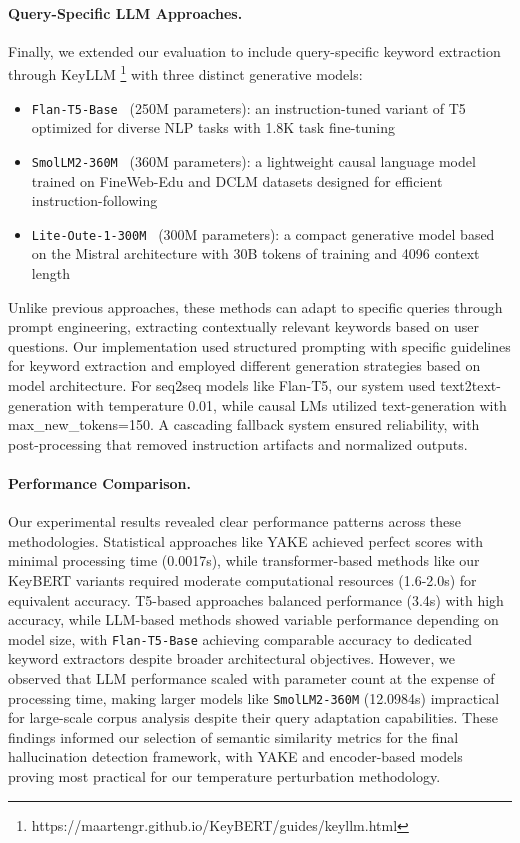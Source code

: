 \documentclass[sigconf]{acmart}
\begin{document}
\paragraph{Query-Specific LLM Approaches.}
Finally, we extended our evaluation to include query-specific keyword extraction through KeyLLM \footnote{https://maartengr.github.io/KeyBERT/guides/keyllm.html} with three distinct generative models:
\begin{itemize}
    \item \texttt{Flan-T5-Base \cite{DBLP:journals/corr/abs-2210-11416}} (250M parameters): an instruction-tuned variant of T5 optimized for diverse NLP tasks with 1.8K task fine-tuning
    \item \texttt{SmolLM2-360M \cite{DBLP:journals/corr/abs-2502-02737}} (360M parameters): a lightweight causal language model trained on FineWeb-Edu and DCLM datasets designed for efficient instruction-following
    \item \texttt{Lite-Oute-1-300M \cite{OuteAI_Lite_Oute_1_300M_2024}} (300M parameters): a compact generative model based on the Mistral architecture with 30B tokens of training and 4096 context length
\end{itemize}

Unlike previous approaches, these methods can adapt to specific queries through prompt engineering, extracting contextually relevant keywords based on user questions. Our implementation used structured prompting with specific guidelines for keyword extraction and employed different generation strategies based on model architecture. For seq2seq models like Flan-T5, our system used text2text-generation with temperature 0.01, while causal LMs utilized text-generation with max\_new\_tokens=150. A cascading fallback system ensured reliability, with post-processing that removed instruction artifacts and normalized outputs.

\paragraph{Performance Comparison.}
Our experimental results revealed clear performance patterns across these methodologies. Statistical approaches like YAKE achieved perfect scores with minimal processing time (0.0017s), while transformer-based methods like our KeyBERT variants required moderate computational resources (1.6-2.0s) for equivalent accuracy. T5-based approaches balanced performance (3.4s) with high accuracy, while LLM-based methods showed variable performance depending on model size, with \texttt{Flan-T5-Base} achieving comparable accuracy to dedicated keyword extractors despite broader architectural objectives. However, we observed that LLM performance scaled with parameter count at the expense of processing time, making larger models like \texttt{SmolLM2-360M} (12.0984s) impractical for large-scale corpus analysis despite their query adaptation capabilities. These findings informed our selection of semantic similarity metrics for the final hallucination detection framework, with YAKE and encoder-based models proving most practical for our temperature perturbation methodology.
\end{document}
